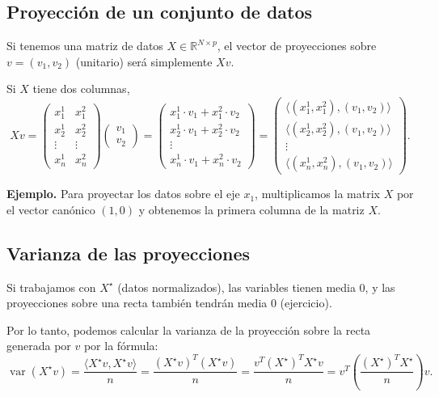 \documentclass[a4paper]{article}
\DeclareMathOperator{\var}{var}
\newcommand{\R}{{\mathbb R}}
\begin{document}
\subsection{Proyección de un conjunto de datos}

Si tenemos una matriz de datos $X \in \R^{N \times p}$, el vector de proyecciones sobre $v = (v_1, v_2)$ (unitario) ser\'a simplemente $Xv$.

Si $X$ tiene dos columnas,
$$
Xv =
\begin{pmatrix} x^1_1 & x^2_1 \\ x^1_2 & x^2_2 \\ \vdots & \vdots \\ x^1_n & x^2_n \end{pmatrix}
\begin{pmatrix} v_1 \\ v_2 \end{pmatrix} =
\begin{pmatrix} x^1_1 \cdot v_1 + x^2_1 \cdot v_2 \\ x^1_2 \cdot v_1 + x^2_2 \cdot v_2 \\ \vdots \\ x^1_n \cdot v_1 + x^2_n \cdot v_2 \end{pmatrix} =
\begin{pmatrix} \langle (x^1_1, x^2_1), (v_1, v_2) \rangle \\ \langle (x^1_2, x^2_2), (v_1, v_2) \rangle  \\ \vdots \\ \langle (x^1_n, x^2_n), (v_1, v_2) \rangle \end{pmatrix}.
$$

\textbf{Ejemplo.} Para proyectar los datos sobre el eje $x_1$, multiplicamos la matrix $X$ por el vector canónico $(1,0)$ y obtenemos la primera columna de la matriz $X$.

\subsection{Varianza de las proyecciones}

Si trabajamos con $X^\star$ (datos normalizados), las variables tienen media 0, y las proyecciones sobre una recta también tendrán media 0 (ejercicio).

Por lo tanto, podemos calcular la varianza de la proyección sobre la recta generada por $v$ por la fórmula:
$$
\var(X^\star v) = \frac{\langle X^\star v, X^\star v \rangle}{n} = \frac{(X^\star v)^T (X^\star v)}{n} = \frac{v^T (X^\star)^T X^\star v}{n} = v^T \left(\frac{(X^\star)^T X^\star}{n}\right) v.
$$
\end{document}
